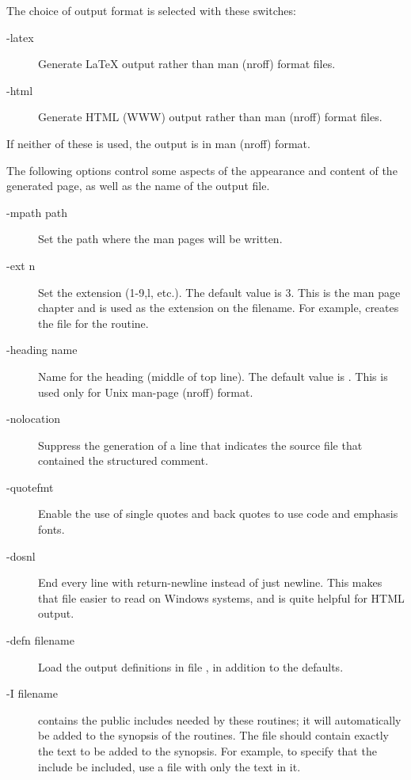 \documentclass[twoside]{linfoem}
\begin{document}
The choice of output format is selected with these switches:
\begin{description}
\item[-latex]
Generate LaTeX output rather than man (nroff) format files.
\item[-html]
Generate HTML (WWW) output rather than man (nroff) format files.
\end{description}
If neither of these is used, the output is in man (nroff) format.

The following options control some aspects of the appearance and content of the
generated page, as well as the name of the output file.
\begin{description}
\item[-mpath path]
Set the path where the man pages will be written.
\item[-ext n]
Set the extension (1-9,l, etc.).  The default value is 3.  This is the man page
chapter and is used as the extension on the filename.  For example,
 creates the file  for the  routine.
\item[-heading name]
Name for the heading (middle of top line).  The default value is .
This is used only for Unix man-page (nroff) format.
\item[-nolocation]
Suppress the generation of a line that indicates the source file that
contained the structured comment.
\item[-quotefmt]
Enable the use of single quotes and back quotes to use code and emphasis
fonts.
\item[-dosnl]
End every line with return-newline instead of just newline.  This makes that
file easier to read on Windows systems, and is quite helpful for HTML output.
\item[-defn filename]Load the output definitions in file , in
  addition to the defaults.  
\item[-I filename]
 contains the public includes needed by these routines; it will
automatically be added to the synopsis of the routines.  The file should
contain exactly the text to be added to the synopsis.  For example, to specify
that the include  be included, use a file with only the text
 in it.
\end{description}
\end{document}
